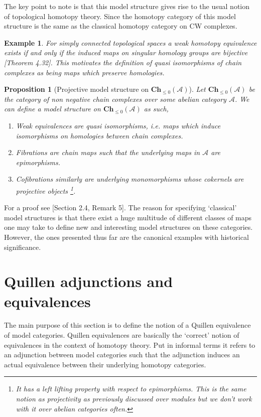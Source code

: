 \documentclass[12pt]{report}
\numberwithin{equation}{section}
\newtheorem{proposition}[dummy]{Proposition}
\newtheorem{example}[dummy]{Example}
\begin{document}
	The key point to note is that this model structure gives rise to the usual notion of topological homotopy theory. Since the homotopy category of this model structure is the same as the classical homotopy category on CW complexes.
	
	\begin{example}
		For simply connected topological spaces a weak homotopy equivalence exists if and only if the induced maps on singular homology groups are bijective \cite{hatcher}[Theorem 4.32]. This motivates the definition of quasi isomorphisms of chain complexes as being maps which preserve homologies.
	\end{example}
	
	\begin{proposition}[Projective model structure on $\mathbf{Ch}_{\leq 0}(\mathcal{A})$]
		Let $\mathbf{Ch}_{\leq 0}(\mathcal{A})$ be the category of non negative chain complexes over some abelian category $\mathcal{A}$. We can define a model structure on $\mathbf{Ch}_{\leq 0}(\mathcal{A})$ as such,
		\begin{enumerate}
			\item Weak equivalences are quasi isomorphisms, i.e. maps which induce isomorphisms on homologies between chain complexes.
			\item Fibrations are chain maps such that the underlying maps in $\mathcal{A}$ are epimorphisms.
			\item Cofibrations similarly are underlying monomorphisms whose cokernels are projective objects \footnote{It has a left lifting property with respect to epimorphisms. This is the same notion as projectivity as previously discussed over modules but we don't work with it over abelian categories often.}.	
		\end{enumerate}
	\end{proposition}
	For a proof see \cite{quillen1967homotopical}[Section 2.4, Remark 5].
	The reason for specifying `classical' model structures is that there exist a huge multitude of different classes of maps one may take to define new and interesting model structures on these categories. However, the ones presented thus far are the canonical examples with historical significance.
	
	\section{Quillen adjunctions and equivalences}
	
	The main purpose of this section is to define the notion of a Quillen equivalence of model categories. Quillen equivalences are basically the `correct' notion of equivalences in the context of homotopy theory. Put in informal terms it refers to an adjunction between model categories such that the adjunction induces an actual equivalence between their underlying homotopy categories. 
	
\end{document}
